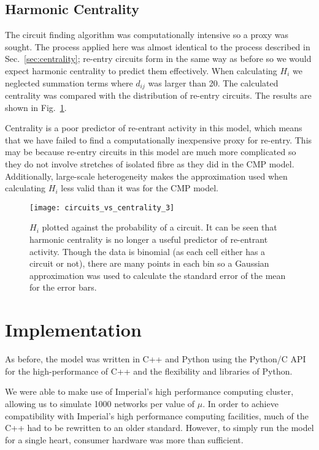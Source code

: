 \clearpage

\subsection{Harmonic Centrality}

The circuit finding algorithm was computationally intensive so a proxy was sought. The process applied here was almost identical to the process described in Sec.~\ref{sec:centrality}; re-entry circuits form in the same way as before so we would expect harmonic centrality to predict them effectively. When calculating $H_i$ we neglected summation terms where $d_{ij}$ was larger than 20. The calculated centrality was compared with the distribution of re-entry circuits. The results are shown in Fig.~\ref{fig:newcentrality}.

Centrality is a poor predictor of re-entrant activity in this model, which means that we have failed to find a computationally inexpensive proxy for re-entry. This may be because re-entry circuits in this model are much more complicated so they do not involve stretches of isolated fibre as they did in the CMP model. Additionally, large-scale heterogeneity makes the approximation used when calculating $H_i$ less valid than it was for the CMP model.

\begin{figure}[h] \begin{mdframed}
    \centering
    \texttt{[image: circuits\_vs\_centrality\_3]}
    \caption{$H_i$ plotted against the probability of a circuit. It can be seen that harmonic centrality is no longer a useful predictor of re-entrant activity. Though the data is binomial (as each cell either has a circuit or not), there are many points in each bin so a Gaussian approximation was used to calculate the standard error of the mean for the error bars.}
    \label{fig:newcentrality}
\end{mdframed} \end{figure}

\clearpage


\section{Implementation}

As before, the model was written in C++ and Python using the Python/C API for the high-performance of C++ and the flexibility and libraries of Python. 

We were able to make use of Imperial's high performance computing cluster, allowing us to simulate 1000 networks per value of $\mu$. In order to achieve compatibility with Imperial's high performance computing facilities, much of the C++ had to be rewritten to an older standard. However, to simply run the model for a single heart, consumer hardware was more than sufficient.

